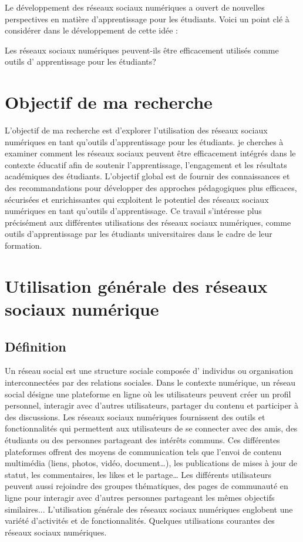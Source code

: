 \documentclass[12pt,a4paper,titlepage]{article}
\begin{document}
Le développement des réseaux sociaux numériques a ouvert de nouvelles perspectives en matière d'apprentissage pour les étudiants. Voici un point clé à considérer dans le développement de cette idée : \newline

Les réseaux sociaux numériques peuvent-ils être efficacement utilisés comme outils d' apprentissage pour les étudiants? \newline

\section{Objectif de ma recherche }
L'objectif de ma recherche est d'explorer l'utilisation des réseaux sociaux numériques en tant qu'outils d'apprentissage pour les étudiants. je cherches à examiner comment les réseaux sociaux peuvent être efficacement intégrés dans le contexte éducatif afin de soutenir l'apprentissage, l'engagement et les résultats académiques des étudiants. L'objectif global est de fournir des connaissances et des recommandations pour développer des approches pédagogiques plus efficaces, sécurisées et enrichissantes qui exploitent le potentiel des réseaux sociaux numériques en tant qu'outils d'apprentissage. Ce travail  s’intéresse plus précisément aux différentes utilisations des réseaux sociaux numériques, comme outils  d’apprentissage par les étudiants universitaires dans le cadre de leur formation. \newline
\section{Utilisation générale des réseaux sociaux numérique }
\subsection{Définition}
Un réseau social est une structure sociale composée d' individus ou organisation interconnectées par des relations sociales.\newline
Dans le contexte numérique, un réseau social désigne une plateforme en ligne où les utilisateurs peuvent créer un profil personnel, interagir avec d'autres utilisateurs, partager du contenu et participer à des discussions. \newline
Les réseaux sociaux numériques fournissent des outils et fonctionnalités qui permettent aux utilisateurs de se connecter avec des amis, des étudiants ou  des personnes partageant des intérêts communs. Ces différentes plateformes offrent des moyens de communication tels que l'envoi de contenu multimédia (liens, photos, vidéo, document…), les publications de mises à jour de statut, les commentaires, les likes et le partage… \newline
Les différents utilisateurs peuvent aussi rejoindre des groupes thématiques, des pages de communauté en ligne pour interagir avec d'autres personnes partageant les mêmes objectifs similaires...\newline
L'utilisation générale des réseaux sociaux numériques englobent une variété d'activités et de fonctionnalités.  Quelques utilisations courantes des réseaux sociaux numériques. \newline
\end{document}
